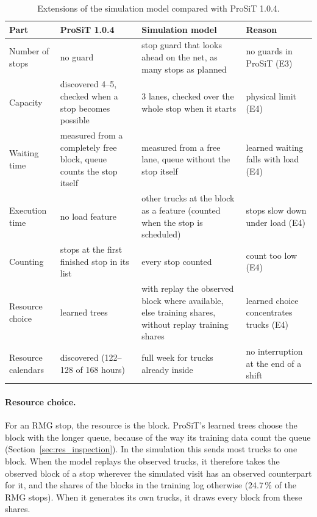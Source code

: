 \begin{table}[htbp]
\centering
\footnotesize
\begin{tabularx}{\textwidth}{L{2.1cm}L{3.4cm}YL{2.4cm}}
\toprule
\textbf{Part} & \textbf{ProSiT 1.0.4} & \textbf{Simulation model} & \textbf{Reason} \\
\midrule
Number of stops & no guard & stop guard that looks ahead on the net, as many stops as planned & no guards in ProSiT (E3) \\
Capacity & discovered 4--5, checked when a stop becomes possible & 3 lanes, checked over the whole stop when it starts & physical limit (E4) \\
Waiting time & measured from a completely free block, queue counts the stop itself & measured from a free lane, queue without the stop itself & learned waiting falls with load (E4) \\
Execution time & no load feature & other trucks at the block as a feature (counted when the stop is scheduled) & stops slow down under load (E4) \\
Counting & stops at the first finished stop in its list & every stop counted & count too low (E4) \\
Resource choice & learned trees & with replay the observed block where available, else training shares, without replay training shares & learned choice concentrates trucks (E4) \\
Resource calendars & discovered (122--128 of 168 hours) & full week for trucks already inside & no interruption at the end of a shift \\
\bottomrule
\end{tabularx}
\par{}
\caption{Extensions of the simulation model compared with ProSiT 1.0.4.}
\label{tab:sim_adaptations}
\label{tab:sim_learned_added}
\end{table}

\paragraph{Resource choice.} For an RMG stop, the resource is the block. ProSiT's
learned trees choose the block with the longer queue, because of the way its
training data count the queue (Section~\ref{sec:res_inspection}). In the simulation
this sends most trucks to one block. When the model replays the observed trucks,
it therefore takes the observed block of a stop wherever the simulated visit has an
observed counterpart for it, and the shares of the blocks in the training log
otherwise (24.7\,\% of the RMG stops). When it generates its own trucks, it
draws every block from these shares.

